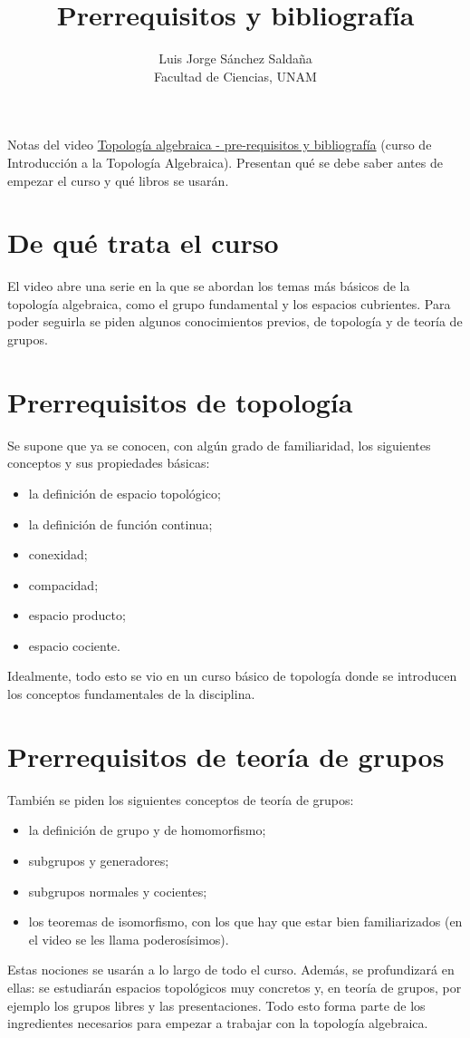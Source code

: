 \documentclass[11pt]{article}
\title{Prerrequisitos y bibliografía}
\author{Luis Jorge Sánchez Saldaña\\[2pt]\small Facultad de Ciencias, UNAM}
\date{}
\begin{document}
\maketitle

\noindent\small Notas del video
\href{https://www.youtube.com/watch?v=p5wiMurVEsE}{\guillemotleft{}Topología algebraica - pre-requisitos y bibliografía\guillemotright{}}
(curso de Introducción a la Topología Algebraica). Presentan qué se debe saber antes de empezar el curso y qué libros se usarán.
\normalsize

\section*{De qué trata el curso}

El video abre una serie en la que se abordan los temas más básicos de la topología algebraica, como el grupo fundamental y los espacios cubrientes. Para poder seguirla se piden algunos conocimientos previos, de topología y de teoría de grupos.

\section*{Prerrequisitos de topología}

Se supone que ya se conocen, con algún grado de familiaridad, los siguientes conceptos y sus propiedades básicas:
\begin{itemize}
  \item la definición de espacio topológico;
  \item la definición de función continua;
  \item conexidad;
  \item compacidad;
  \item espacio producto;
  \item espacio cociente.
\end{itemize}
Idealmente, todo esto se vio en un curso básico de topología donde se introducen los conceptos fundamentales de la disciplina.

\section*{Prerrequisitos de teoría de grupos}

También se piden los siguientes conceptos de teoría de grupos:
\begin{itemize}
  \item la definición de grupo y de homomorfismo;
  \item subgrupos y generadores;
  \item subgrupos normales y cocientes;
  \item los teoremas de isomorfismo, con los que hay que estar bien familiarizados (en el video se les llama \guillemotleft{}poderosísimos\guillemotright{}).
\end{itemize}
Estas nociones se usarán a lo largo de todo el curso. Además, se profundizará en ellas: se estudiarán espacios topológicos muy concretos y, en teoría de grupos, por ejemplo los grupos libres y las presentaciones. Todo esto forma parte de los ingredientes necesarios para empezar a trabajar con la topología algebraica.
\end{document}
